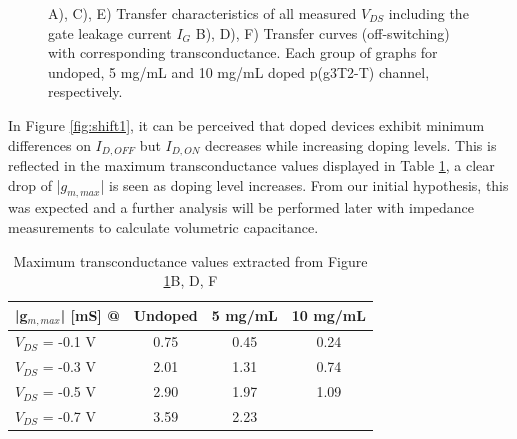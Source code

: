 \begin{figure}[!htb]
    \caption[Transfer characteristics and transconductance at different doping levels and $V_{DS}$]{A), C), E) Transfer characteristics of all measured $V_{DS}$ including the gate leakage current $I_{G}$ B), D), F) Transfer curves (off-switching) with corresponding transconductance. Each group of graphs for undoped, 5 mg/mL and 10 mg/mL doped p(g3T2-T) channel, respectively.}
    \label{fig:transx2}
\end{figure}


In Figure \ref{fig:shift1}, it can be perceived that doped devices exhibit minimum differences on $I_{D,OFF}$ but $I_{D,ON}$ decreases while increasing doping levels. This is reflected in the maximum transconductance values displayed in Table \ref{tab:trans}, a clear drop of |$g_{m,max}$| is seen as doping level increases. From our initial hypothesis, this was expected and a further analysis will be performed later with impedance measurements to calculate volumetric capacitance. %


\begin{table}[ht]
\centering
\caption{Maximum transconductance values extracted from Figure \ref{fig:transx2}B, D, F}
\begin{tabular}{l|c|c|c}
|g$_{m,max}$| [mS] @ & Undoped & 5 mg/mL & 10 mg/mL \\\hline
$V_{DS}$ = -0.1 V & 0.75 & 0.45 & 0.24\\
$V_{DS}$ = -0.3 V & 2.01 & 1.31 & 0.74\\
$V_{DS}$ = -0.5 V & 2.90 & 1.97 & 1.09\\
$V_{DS}$ = -0.7 V & 3.59 & 2.23 & \\ \hline
\end{tabular}
\label{tab:trans}
\end{table}


